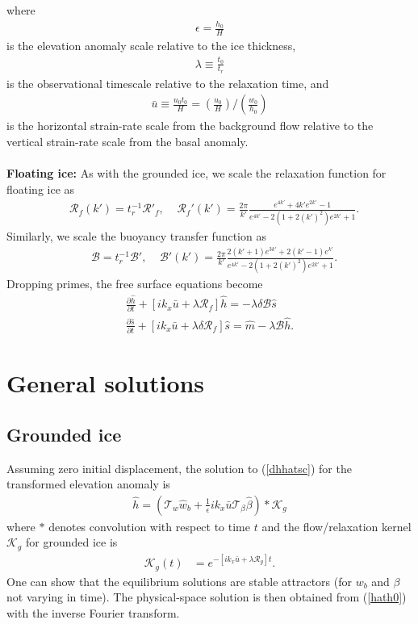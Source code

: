 \documentclass[paper=a4, fontsize=11pt]{article}
\begin{document}
where
\begin{align}
\epsilon = \frac{h_0}{H}
\end{align}
is the elevation anomaly scale relative to the ice thickness,
\begin{align}
  \lambda \equiv  \frac{t_0}{t_r}
\end{align}
is the observational timescale relative to the relaxation time, and
\begin{align}
\bar{u} \equiv \frac{u_0 t_0}{H} = \left(\frac{u_0}{H}\right) / \left(\frac{w_0}{h_0}\right)
\end{align}
is the horizontal strain-rate scale from the background flow relative to the vertical strain-rate
scale from the basal anomaly.
\\ \\
\textbf{Floating ice:}
As with the grounded ice, we scale the relaxation function for floating ice as
\begin{align}
   &\mathcal{R}_f(k') = t_r^{-1} \mathcal{R}'_f, \;\;\;\;
 \mathcal{R}_f'(k') =  \frac{2\pi}{k'}\frac{e^{4k'} +4k' e^{2k'} -1 }{e^{4k'} -2(1+2(k')^2)e^{2k'} +1}. \label{Rfsc}
\end{align}
Similarly, we scale the buoyancy transfer function as
\begin{align}
   &\mathcal{B} =  t_r^{-1} \mathcal{B}', \;\;\;\;
 \mathcal{B}'(k') =   \frac{2\pi}{k'}\frac{ 2(k'+1)e^{3k'}+2(k'-1)e^{k'} }{e^{4k'} -2(1+2(k')^2)e^{2k'} +1}. \label{Bsc}
\end{align}
Dropping primes, the free surface equations become
\begin{align}
\frac{\partial \widehat{h}}{\partial t}+ \left[ik_x \bar{u}  + \lambda \mathcal{R}_f\right]\widehat{h} = -\lambda \delta\mathcal{B}\widehat{s}\label{hfsc}\\
\frac{\partial \widehat{s}}{\partial t}+ [ik_x\bar{u}  + \lambda\delta \mathcal{R}_f]\widehat{s} = \widehat{m} - \lambda \mathcal{B} \widehat{h}.\label{sfsc}
\end{align}

\section*{General solutions}
\subsection*{Grounded ice}
Assuming zero initial displacement, the solution to (\ref{dhhatsc}) for the transformed elevation anomaly is
\begin{align}
\widehat{h} = (\mathcal{T}_w\widehat{w}_b + \tfrac{1}{\epsilon}ik_x\bar{u}\mathcal{T}_{\beta}\widehat{\beta}  )* \mathcal{K}_g \label{hath0}
\end{align}
where $*$ denotes convolution with respect to time $t$ and
the flow/relaxation kernel $\mathcal{K}_g$ for grounded ice is
\begin{align}
\mathcal{K}_g(t) &= e^{-[ik_x\bar{u}+\lambda \mathcal{R}_g]t}.
\end{align}
One can show that the equilibrium solutions are stable attractors
(for $w_b$ and $\beta$ not varying in time).
The physical-space solution is then obtained from (\ref{hath0}) with the inverse Fourier transform.
\end{document}
